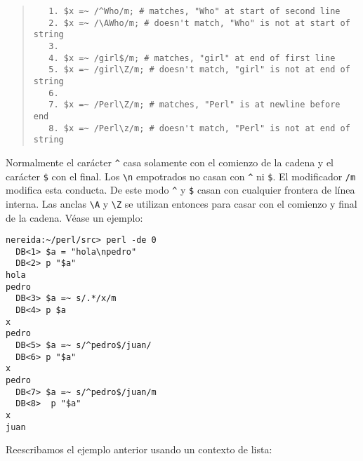 \begin{it}
\begin{quotation}
\begin{verbatim}
   1. $x =~ /^Who/m; # matches, "Who" at start of second line
   2. $x =~ /\AWho/m; # doesn't match, "Who" is not at start of string
   3.
   4. $x =~ /girl$/m; # matches, "girl" at end of first line
   5. $x =~ /girl\Z/m; # doesn't match, "girl" is not at end of string
   6.
   7. $x =~ /Perl\Z/m; # matches, "Perl" is at newline before end
   8. $x =~ /Perl\z/m; # doesn't match, "Perl" is not at end of string
\end{verbatim}
\end{quotation}
\end{it}
Normalmente el carácter \verb|^| casa solamente con el comienzo de la
cadena y el carácter \verb|$| con el final. Los \verb|\n| empotrados
no casan
con \verb|^| ni \verb|$|. El modificador \verb|/m| modifica esta
conducta. De este modo \verb|^| y  \verb|$| casan con cualquier frontera
de línea interna. Las anclas \verb|\A| y \verb|\Z| se utilizan entonces
para casar con
el comienzo y final de la cadena.
Véase un ejemplo:
\begin{verbatim}
nereida:~/perl/src> perl -de 0
  DB<1> $a = "hola\npedro"
  DB<2> p "$a"
hola
pedro
  DB<3> $a =~ s/.*/x/m
  DB<4> p $a
x
pedro
  DB<5> $a =~ s/^pedro$/juan/
  DB<6> p "$a"
x
pedro
  DB<7> $a =~ s/^pedro$/juan/m
  DB<8>  p "$a"
x
juan
\end{verbatim}



Reescribamos el ejemplo anterior usando un contexto de lista:

